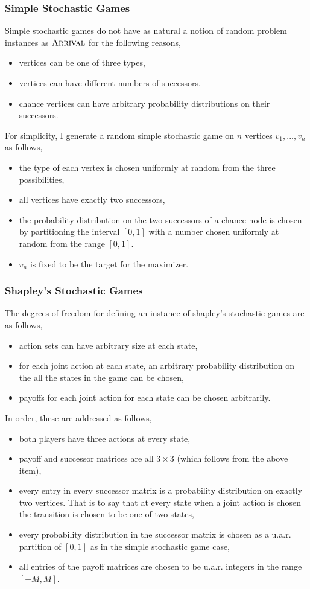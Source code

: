 \subsubsection{Simple Stochastic Games}
Simple stochastic games do not have as natural a notion of random problem instances as $\textsc{Arrival}$ for the following reasons,
\begin{itemize}
  \item vertices can be one of three types, 
  \item vertices can have different numbers of successors,
  \item chance vertices can have arbitrary probability distributions on their successors.
\end{itemize}
For simplicity, I generate a random simple stochastic game on $n$ vertices $v_1, ..., v_n$ as follows,
\begin{itemize}
  \item the type of each vertex is chosen uniformly at random from the three possibilities,
  \item all vertices have exactly two successors,
  \item the probability distribution on the two successors of a chance node is chosen by
    partitioning the interval $[0, 1]$ with a number chosen uniformly at random from the range $[0, 1]$.
  \item $v_n$ is fixed to be the target for the maximizer.
\end{itemize}

\subsubsection{Shapley's Stochastic Games}
The degrees of freedom for defining an instance of shapley's stochastic games are as follows,
\begin{itemize}
  \item action sets can have arbitrary size at each state,
  \item for each joint action at each state, an arbitrary probability distribution on the all
    the states in the game can be chosen,
  \item payoffs for each joint action for each state can be chosen arbitrarily.
\end{itemize}
In order, these are addressed as follows,
\begin{itemize}
  \item both players have three actions at every state,
  \item payoff and successor matrices are all $3 \times 3$ (which follows from the above item),
  \item every entry in every successor matrix is a probability distribution on exactly two vertices.
    That is to say that at every state when a joint action is chosen the transition is chosen
    to be one of two states,
  \item every probability distribution in the successor matrix is chosen as a u.a.r. partition of $[0, 1]$
    as in the simple stochastic game case,
  \item all entries of the payoff matrices are chosen to be u.a.r. integers in the range $[-M, M]$.
\end{itemize}
